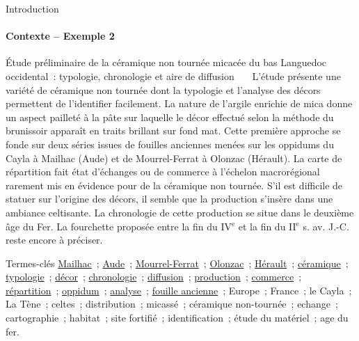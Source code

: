 \begin{frame}{Introduction}\framesubtitle{Contexte -- Exemple 2}
  \vspace{-.33em}
  \begin{exampleblock}{\small
    Étude préliminaire de la céramique non tournée micacée du bas Languedoc
    occidental~: typologie, chronologie et aire de diffusion
  }\justifying\small
    ~~~L'étude présente une variété de céramique non tournée dont la typologie
    et l'analyse des décors permettent de l'identifier facilement. La nature de
    l'argile enrichie de mica donne un aspect pailleté à la pâte sur laquelle le
    décor effectué selon la méthode du brunissoir apparaît en traits brillant
    sur fond mat. Cette première approche se fonde sur deux séries issues de
    fouilles anciennes menées sur les oppidums du Cayla à Mailhac (Aude) et de
    Mourrel-Ferrat à Olonzac (Hérault). La carte de répartition fait état
    d'échanges ou de commerce à l'échelon macrorégional rarement mis en évidence
    pour de la céramique non tournée. S'il est difficile de statuer sur
    l'origine des décors, il semble que la production s'insère dans une ambiance
    celtisante. La chronologie de cette production se situe dans le deuxième âge
    du Fer. La fourchette proposée entre la fin du IV$^\text{e}$ et la fin du
    II$^\text{e}$ s. av. J.-C. reste encore à préciser.

    \begin{exampleblock}{\small Termes-clés}\justifying\small
      \underline{Mailhac}~; \underline{Aude}~; \underline{Mourrel-Ferrat}~;
      \underline{Olonzac}~; \underline{Hérault}~; \underline{céramique}~;
      \underline{typologie}~; \underline{décor}~; \underline{chronologie}~;
      \underline{diffusion}~; \underline{production}~; \underline{commerce}~;
      \underline{répartition}~; \underline{oppidum}~; \underline{analyse}~;
      \underline{fouille ancienne}~; Europe~; France~; le Cayla~; La Tène~;
      celtes~; distribution~; micassé~; céramique non-tournée~; echange~;
      cartographie~; habitat~; site fortifié~; identification~; étude du
      matériel~; age du fer.
    \end{exampleblock}
  \end{exampleblock}
\end{frame}

